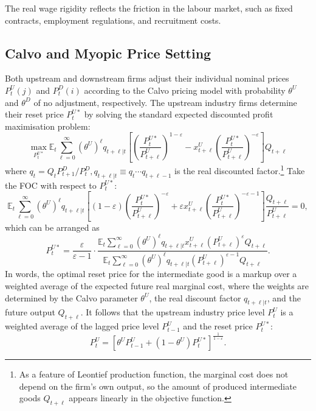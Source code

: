 \documentclass[a4paper, 12pt]{article}
\newcommand{\E}{\mathbb{E}}
\newcommand{\suminf}[1]{\sum_{#1=0}^\infty}
\theoremstyle{definition*}
\begin{document}
The real wage rigidity reflects the friction in the labour market, such as fixed contracts, employment regulations, and recruitment costs.

\subsection{Calvo and Myopic Price Setting}
Both upstream and downstream firms adjust their individual nominal prices $P^U_t(j)$ and $P^D_t(i)$ according to the Calvo pricing model with probability $\theta^U$ and $\theta^D$ of no adjustment, respectively.
The upstream industry firms determine their reset price $P^{U*}_t$ by solving the standard expected discounted profit maximisation problem:
\begin{equation}
  \max_{P^{U*}_t}\E_t\suminf{\ell}(\theta^U)^\ell q_{t+\ell|t}\left[\left(\frac{P^{U*}_t}{P^U_{t+\ell}}\right)^{1 - \varepsilon} - x^U_{t+\ell}\left(\frac{P^{U*}_t}{P^U_{t+\ell}}\right)^{-\varepsilon}\right]Q_{t+\ell}
\end{equation}
where $q_t = Q_tP^D_{t+1}/P^D_t, q_{t+\ell|t} \equiv q_t\cdots q_{t+\ell-1}$ is the real discounted factor.\footnote{As a feature of Leontief production function, the marginal cost does not depend on the firm's own output, so the amount of produced intermediate goods $Q_{t+\ell}$ appears linearly in the objective function.}
Take the FOC with respect to $P^{U*}_t$:
\begin{equation}
  \E_t \suminf{\ell} (\theta^U)^\ell q_{t+\ell|t} \left[(1-\varepsilon) \left( \frac{P^{U*}_t}{P^U_{t+\ell}} \right)^{-\varepsilon} + \varepsilon x^U_{t+\ell} \left( \frac{P^{U*}_t}{P^U_{t+\ell}} \right)^{-\varepsilon-1}\right] \frac{Q_{t+\ell}}{P^U_{t+\ell}} = 0,
\end{equation}
which can be arranged as
\begin{equation}
  P^{U*}_t = \frac{\varepsilon}{\varepsilon-1} \cdot \frac{\E_t \suminf{\ell} (\theta^U)^\ell q_{t+\ell|t} x^U_{t+\ell} (P^U_{t+\ell})^{\varepsilon} Q_{t+\ell}}{\E_t \suminf{\ell} (\theta^U)^\ell q_{t+\ell|t} (P^U_{t+\ell})^{\varepsilon-1} Q_{t+\ell}}.
\end{equation}
In words, the optimal reset price for the intermediate good is a markup over a weighted average of the expected future real marginal cost, where the weights are determined by the Calvo parameter $\theta^U$, the real discount factor $q_{t+\ell|t}$, and the future output $Q_{t+\ell}$.
It follows that the upstream industry price level $P^U_t$ is a weighted average of the lagged price level $P^U_{t-1}$ and the reset price $P^{U*}_t$:
\begin{equation}
  P^U_t = [\theta^U P^U_{t-1} + (1 - \theta^U)P^{U*}_t]^\frac{1}{1 - \varepsilon}.
\end{equation}
\end{document}
